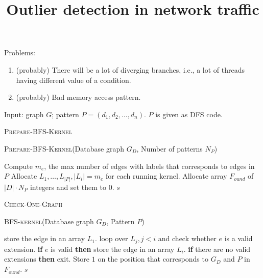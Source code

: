 \documentclass[a4paper,11pt]{article}
\title{Outlier detection in network traffic}
\date{}
\begin{document}
\noindent Problems:
\begin{enumerate}
\item (probably) There will be a lot of diverging branches, i.e., a lot of threads having different value of a condition.
\item (probably) Bad memory access pattern.
\end{enumerate}

Input: graph $G$; pattern $P=(d_1,d_2, \ldots, d_n)$. $P$ is given as DFS code.


\begin{algorithm}
\caption{\textsc{Prepare-BFS-Kernel}}
\label{alg:compute-support}
\vbox{\textsc{Prepare-BFS-Kernel}(Database graph $G_D$, Number of patterns $N_P$)}
\begin{algorithmic}[1]
\STATE Compute $m_e$, the max number of edges with labels that corresponds to edges in $P$
\STATE Allocate $L_1,\ldots, L_{|P|}, |L_i|=m_e$ for each running kernel.
\STATE Allocate array $F_{ound}$ of $|D|\cdot N_P$ integers and set them to 0.
\RETURN $s$
\end{algorithmic}
\end{algorithm}


\begin{algorithm}
\caption{\textsc{Check-One-Graph}}
\label{alg:compute-support}
\vbox{\textsc{BFS-kernel}(Database graph $G_D$, Pattern $P$)}
\begin{algorithmic}[1]
\STATE store the edge in an array $L_1$.
\ENDFOR
{}
\STATE loop over $L_j, j < i$ and check whether $e$ is a valid extension.
\STATE \textbf{if} $e$ is valid \textbf{then} store the edge in an array $L_i$.
\STATE \textbf{if} there are no valid extensions \textbf{then}  exit.
\ENDFOR
\ENDFOR
\STATE Store $1$ on the position that corresponds to $G_D$ and $P$ in $F_{ound}$.
\RETURN $s$
\end{algorithmic}
\end{algorithm}
\end{document}
